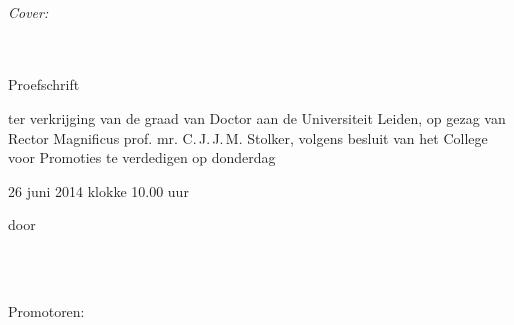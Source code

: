 \thesisprintdetails\\

\ifdefined\thesiscoverimgdesc%
\emph{Cover:} \thesiscoverimgdesc\\
\fi
\clearpage


\begin{center}
  {
    {\Huge \thesistitle }\\[1em]
    {\huge \thesissubtitle }\\[5em]
    {\Large Proefschrift}\\[5em]
    {\Large \parbox{0.55 \textwidth}{ter verkrijging van de graad van Doctor aan de Universiteit Leiden, op gezag van Rector Magnificus prof\@. mr\@. C.\,J.\,J.\,M\@. Stolker,
volgens besluit van het College voor Promoties
te verdedigen op donderdag \linebreak\centerline{26 juni 2014 klokke 10.00 uur}}}\vfill
	{\Large door}\\[3em]
	{\LARGE \thesisauthorfull}\\[3em]
	{\Large \thesisauthorborn}
  }
\end{center}

\clearpage


{%
\ifdefined\thesiscomittee%
\large%
\hspace{3.6cm}\parbox[t]{0.7\textwidth}{%
\thesispromotores}\\[1cm]
\hspace{3.6cm}\parbox[t]{0.7\textwidth}{%
\thesiscomittee}
\else
\large%
{Promotoren:}\quad\parbox[t]{0.7\textwidth}{%
\thesispromotores}\\[1cm]
\fi
}
\vfill

